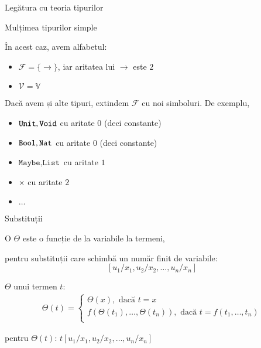 \documentclass[xcolor=pdftex,romanian,colorlinks]{beamer}
\begin{document}
\begin{frame}{Legătura cu teoria tipurilor}

Mulțimea  \alert{tipurilor simple}  \hspace{.2cm}
 
În acest caz, avem alfabetul:
\vspace{-.2cm}
\begin{itemize}
	\item $\mathcal{F} = \{\to\}$, iar aritatea lui $\to$ este $2$
	\item $\mathcal{V} = \mathbb{V}$
\end{itemize}

\vspace{.4cm}
Dacă avem și alte tipuri, extindem $\mathcal{F}$ cu noi simboluri. De exemplu,
\vspace{-.2cm}
\begin{itemize}
	\item $\texttt{Unit}, \texttt{Void}$ cu aritate $0$ (deci constante)
	\item $\texttt{Bool}, \texttt{Nat}$ cu aritate $0$ (deci constante)
	\item $\texttt{Maybe}, \texttt{List}$ cu aritate $1$
	\item $\times$ cu aritate $2$
	\item $\ldots$
\end{itemize}


\end{frame}

\begin{frame}{Substituții}

O  $\Theta$ este o funcție de la variabile la termeni,
\vspace{-.2cm}
	\begin{center}
	\end{center}
 pentru substituții care schimbă un număr finit de variabile:
$$[u_1 / x_1, u_2 / x_2, \ldots, u_n / x_n]$$

\medskip
{} $\Theta$ unui termen $t$:
\begin{align*}
\Theta(t) = 
\left\{
	\begin{array}{ll}
		\Theta(x), \mbox{ dacă } t = x \\
		f(\Theta(t_1),\ldots,\Theta(t_n)), \mbox{ dacă } t = f(t_1,\ldots,t_n) \\
	\end{array}
\right. 
\end{align*}

 pentru $\Theta(t)$: $t [u_1 / x_1, u_2 / x_2, \ldots, u_n / x_n]$
\end{frame}
\end{document}
